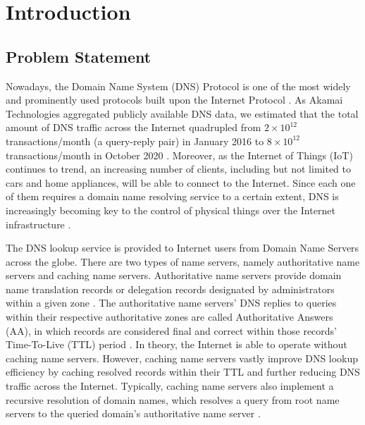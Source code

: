 \documentclass[a4paper]{report}
\begin{document}
\tableofcontents

\newpage
\setcounter{page}{1}

\chapter{Introduction}

\section{Problem Statement}
\label{section:introduction-problemstatement}

Nowadays, the Domain Name System (DNS) Protocol is one of the most widely and prominently used protocols built upon the Internet Protocol \cite{RFC-1034}. As Akamai Technologies aggregated publicly available DNS data, we estimated that the total amount of DNS traffic across the Internet quadrupled from $ 2 \times 10^{12}$ transactions/month (a query-reply pair) in January 2016 to $8 \times 10^{12}$ transactions/month in October 2020 \cite{DNS-Trends-and-Traffic}. Moreover, as the Internet of Things (IoT) continues to trend, an increasing number of clients, including but not limited to cars and home appliances, will be able to connect to the Internet. Since each one of them requires a domain name resolving service to a certain extent, DNS is increasingly becoming key to the control of physical things over the Internet infrastructure \cite{satam2015anomaly}.

The DNS lookup service is provided to Internet users from Domain Name Servers across the globe. There are two types of name servers, namely authoritative name servers and caching name servers. Authoritative name servers provide domain name translation records or delegation records designated by administrators within a given zone \cite{BCP-219}. The authoritative name servers' DNS replies to queries within their respective authoritative zones are called Authoritative Answers (AA), in which records are considered final and correct within those records' Time-To-Live (TTL) period \cite{BCP-219, RFC-1035}. In theory, the Internet is able to operate without caching name servers. However, caching name servers vastly improve DNS lookup efficiency by caching resolved records within their TTL and further reducing DNS traffic across the Internet. Typically, caching name servers also implement a recursive resolution of domain names, which resolves a query from root name servers to the queried domain's authoritative name server \cite{finch-2015}.
\end{document}
